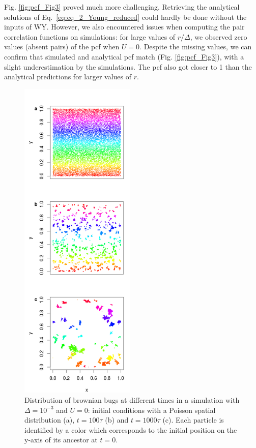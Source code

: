 Fig. \ref{fig:pcf_Fig3} proved much more challenging. Retrieving the analytical solutions of Eq.~\ref{eq:eq_2_Young_reduced} could hardly be done without the inputs of WY. However, we also encountered issues when computing the pair correlation functions on simulations: for large values of $r/\Delta$, we observed zero values (absent pairs) of the pcf when $U=0$. Despite the missing values, we can confirm that simulated and analytical pcf match (Fig. \ref{fig:pcf_Fig3}), with a slight underestimation by the simulations. The pcf also got closer to 1 than the analytical predictions for larger values of $r$. %

\begin{figure}[H]
\begin{center} 
 \includegraphics[width=0.49\textwidth]{../code/figure/spatial_distribution_Fig1.png}
  \caption{Distribution of brownian bugs at different times in a simulation with $\Delta=10^{-3}$ and $U=0$: initial conditions with a Poisson spatial distribution (a), $t=100\tau$ (b) and $t=1000\tau$ (c). Each particle is identified by a color which corresponds to the initial position on the y-axis of its ancestor at $t=0$.}
  \label{fig:spatial_fig1}
\end{center}
  \end{figure}

